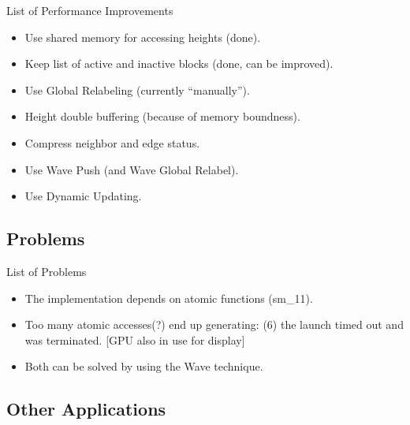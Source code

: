 \documentclass{beamer}
\begin{document}
\begin{frame}{List of Performance Improvements}
\begin{itemize}
\item
Use shared memory for accessing heights (done).
\item
Keep list of active and inactive blocks (done, can be improved).
\item
Use Global Relabeling (currently ``manually'').
\item
Height double buffering (because of memory boundness).
\item
Compress neighbor and edge status.
\item
Use Wave Push (and Wave Global Relabel).
\item
Use Dynamic Updating.
\end{itemize}
\end{frame}

\subsection{Problems}

\begin{frame}{List of Problems}
\begin{itemize}
\item
The implementation depends on atomic functions (sm\_11).
\item
Too many atomic accesses(?) end up generating: (6) the launch timed out and was terminated. [GPU also in use for display]
\item
Both can be solved by using the \alert{Wave technique}.
\end{itemize}
\end{frame}

\subsection{Other Applications}
\end{document}
